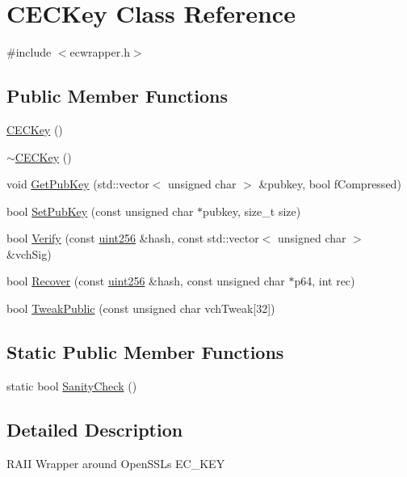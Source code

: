 \hypertarget{class_c_e_c_key}{}\section{C\+E\+C\+Key Class Reference}
\label{class_c_e_c_key}


{\ttfamily \#include $<$ecwrapper.\+h$>$}

\subsection*{Public Member Functions}
\begin{DoxyCompactItemize}
\item 
\hyperlink{class_c_e_c_key_a5ee51ce7e5435b8d337913540947e58a}{C\+E\+C\+Key} ()
\item 
\hyperlink{class_c_e_c_key_abc742c7fb8362b693745eeb76324dbde}{$\sim$\+C\+E\+C\+Key} ()
\item 
void \hyperlink{class_c_e_c_key_ab3cb52ca6bf3bdd55be9152a76da9112}{Get\+Pub\+Key} (std\+::vector$<$ unsigned char $>$ \&pubkey, bool f\+Compressed)
\item 
bool \hyperlink{class_c_e_c_key_a07055de929aa6e4f4b692fb2bd272fdd}{Set\+Pub\+Key} (const unsigned char $\ast$pubkey, size\+\_\+t size)
\item 
bool \hyperlink{class_c_e_c_key_abbefe8d295d0bbed97d2709a3a534375}{Verify} (const \hyperlink{classuint256}{uint256} \&hash, const std\+::vector$<$ unsigned char $>$ \&vch\+Sig)
\item 
bool \hyperlink{class_c_e_c_key_a5d7ed3acdc6c2798af3242cacc7b755b}{Recover} (const \hyperlink{classuint256}{uint256} \&hash, const unsigned char $\ast$p64, int rec)
\item 
bool \hyperlink{class_c_e_c_key_a5f6013e6314a8ca9645a49106091ad89}{Tweak\+Public} (const unsigned char vch\+Tweak\mbox{[}32\mbox{]})
\end{DoxyCompactItemize}
\subsection*{Static Public Member Functions}
\begin{DoxyCompactItemize}
\item 
static bool \hyperlink{class_c_e_c_key_a3d11821aa2328baf3bd684e5c1835314}{Sanity\+Check} ()
\end{DoxyCompactItemize}


\subsection{Detailed Description}
R\+A\+I\+I Wrapper around Open\+S\+S\+L\textquotesingle{}s E\+C\+\_\+\+K\+E\+Y 

